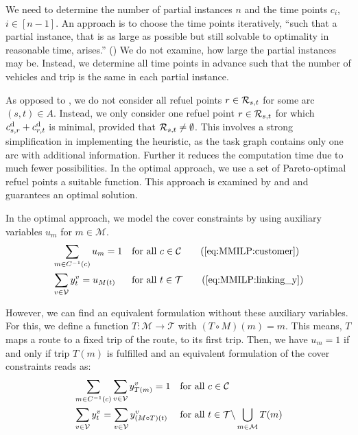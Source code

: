 We need to determine the number of partial instances $n$ and the time points $c_i$, ${i\in[n-1]}$. An approach is to choose the time points iteratively, \enquote{such that a partial instance, that is as large as possible but still solvable to optimality in reasonable time, arises.} (\cite[p.~131]{Knoll}) We do not examine, how large the partial instances may be. Instead, we determine all time points in advance such that the number of vehicles and trip is the same in each partial instance.

As opposed to , we do not consider all refuel points $r\in\mathcal{R}_{s,t}$ for some arc $(s,t)\in A$. Instead, we only consider one refuel point $r\in\mathcal{R}_{s,t}$ for which ${c^{\operatorname{d}}_{s,r} + c^{\operatorname{d}}_{r,t}}$ is minimal, provided that ${\mathcal{R}_{s,t}\neq\emptyset}$. This involves a strong simplification in implementing the heuristic, as the task graph contains only one arc with additional information. Further it reduces the computation time due to much fewer possibilities. In the optimal approach, we use a set of Pareto-optimal refuel points \wrt a suitable function. This approach is examined by \cite[Sec.~3.2.2]{Kaiser} and \cite[Sec.~3.2.2]{Knoll} and guarantees an optimal solution.

In the optimal approach, we model the cover constraints by using auxiliary variables $u_m$ for ${m\in\mathcal{M}}$.
\begin{align*}
	& \sum_{m\in C^{-1}(c)} u_m = 1 && \text{for all } c\in\mathcal{C} \tag{\ref{eq:MMILP:customer}} \\
	& \sum_{v\in\mathcal{V}} y^v_t = u_{M(t)} && \text{for all } t\in\mathcal{T} \tag{\ref{eq:MMILP:linking_y}}
\end{align*}

However, we can find an equivalent formulation without these auxiliary variables. For this, we define a function ${T:\mathcal{M}\to\mathcal{T}}$ with ${\left(T\circ M\right)(m)=m}$. This means, $T$ maps a route to a fixed trip of the route, \eg to its first trip. Then, we have ${u_m=1}$ if and only if trip $T(m)$ is fulfilled and an equivalent formulation of the cover constraints reads as:
\begin{align*}
	& \sum_{m\in C^{-1}(c)} \sum_{v\in\mathcal{V}} y^v_{T(m)} = 1 && \text{for all } c\in\mathcal{C} \\
	& \sum_{v\in\mathcal{V}} y^v_t = \sum_{v\in\mathcal{V}} y^v_{(M\circ T)(t)} && \text{for all } t\in\mathcal{T}\backslash\bigcup_{m\in\mathcal{M}} T(m)
\end{align*}

